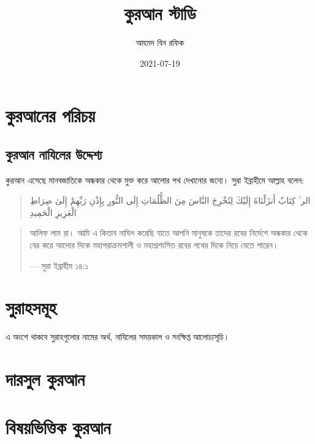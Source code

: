 \documentclass[
]{book}
\title{কুরআন স্টাডি}
\author{আহমদ বিন রফিক}
\date{2021-07-19}
\begin{document}
\maketitle

{
\setcounter{tocdepth}{1}
\tableofcontents
}
\hypertarget{about-quran}{%
\chapter*{কুরআনের পরিচয়}\label{about-quran}}

\hypertarget{why-quran-was-revealed}{%
\section*{কুরআন নাযিলের উদ্দেশ্য}\label{why-quran-was-revealed}}

কুরআন এসেছে মানবজাতিকে অন্ধকার থেকে মুক্ত করে আলোর পথ দেখানোর জন্যে। সুরা ইব্রাহীমে আল্লাহ বলেন:

\begin{quote}
الر ۚ كِتَابٌ أَنزَلْنَاهُ إِلَيْكَ لِتُخْرِجَ النَّاسَ مِنَ الظُّلُمَاتِ إِلَى النُّورِ بِإِذْنِ رَبِّهِمْ إِلَىٰ صِرَاطِ الْعَزِيزِ الْحَمِيدِ
\end{quote}

\begin{quote}
আলিফ লাম রা। আমি এ কিতাব নাযিল করেছি যাতে আপনি মানুষকে তাদের রবের নির্দেশে অন্ধকার থেকে বের করে আলোর দিকে মহাপরাক্রমশালী ও মহাপ্রশংসিত রবের পথের দিকে নিয়ে যেতে পারেন।

--- সুরা ইব্রাহীম ১৪:১
\end{quote}

\hypertarget{surah}{%
\chapter*{সুরাহসমূহ}\label{surah}}

এ অংশে থাকবে সুরাহগুলোর নামের অর্থ, নাযিলের সময়কাল ও সংক্ষিপ্ত আলোচ্যসূচি।

\hypertarget{dars}{%
\chapter*{দারসুল কুরআন}\label{dars}}

\hypertarget{quran-index}{%
\chapter*{বিষয়ভিত্তিক কুরআন}\label{quran-index}}
\end{document}
